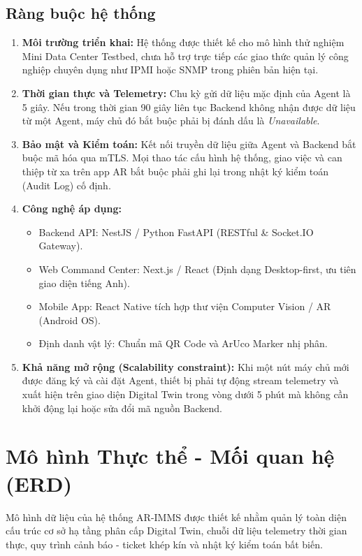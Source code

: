 \subsection{Ràng buộc hệ thống}
\begin{enumerate}
    \item \textbf{Môi trường triển khai:} Hệ thống được thiết kế cho mô hình thử nghiệm Mini Data Center Testbed, chưa hỗ trợ trực tiếp các giao thức quản lý công nghiệp chuyên dụng như IPMI hoặc SNMP trong phiên bản hiện tại.
    \item \textbf{Thời gian thực và Telemetry:} Chu kỳ gửi dữ liệu mặc định của Agent là 5 giây. Nếu trong thời gian 90 giây liên tục Backend không nhận được dữ liệu từ một Agent, máy chủ đó bắt buộc phải bị đánh dấu là \textit{Unavailable}.
    \item \textbf{Bảo mật và Kiểm toán:} Kết nối truyền dữ liệu giữa Agent và Backend bắt buộc mã hóa qua mTLS. Mọi thao tác cấu hình hệ thống, giao việc và can thiệp từ xa trên app AR bắt buộc phải ghi lại trong nhật ký kiểm toán (Audit Log) cố định.
    \item \textbf{Công nghệ áp dụng:}
    \begin{itemize}
        \item Backend API: NestJS / Python FastAPI (RESTful \& Socket.IO Gateway).
        \item Web Command Center: Next.js / React (Định dạng Desktop-first, ưu tiên giao diện tiếng Anh).
        \item Mobile App: React Native tích hợp thư viện Computer Vision / AR (Android OS).
        \item Định danh vật lý: Chuẩn mã QR Code và ArUco Marker nhị phân.
    \end{itemize}
    \item \textbf{Khả năng mở rộng (Scalability constraint):} Khi một nút máy chủ mới được đăng ký và cài đặt Agent, thiết bị phải tự động stream telemetry và xuất hiện trên giao diện Digital Twin trong vòng dưới 5 phút mà không cần khởi động lại hoặc sửa đổi mã nguồn Backend.
\end{enumerate}

\section{Mô hình Thực thể - Mối quan hệ (ERD)}
Mô hình dữ liệu của hệ thống AR-IMMS được thiết kế nhằm quản lý toàn diện cấu trúc cơ sở hạ tầng phân cấp Digital Twin, chuỗi dữ liệu telemetry thời gian thực, quy trình cảnh báo - ticket khép kín và nhật ký kiểm toán bất biến.

